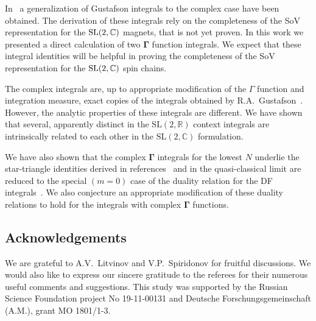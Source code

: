 \documentclass[pdftex]{sigma}
\numberwithin{equation}{section}
\begin{document}
In~\cite{Derkachov:2016ucn,Derkachov:2017pvx} a generalization of Gustafson integrals to the complex case
have been obtained. The derivation of these integrals rely on the completeness of the SoV representation for the
${\rm SL}(2,\mathbb C)$ magnets, that is not yet proven. In this work we presented a direct calculation of two
$\boldsymbol\Gamma$ function integrals. We expect that these integral identities will be helpful in proving the
completeness of the SoV representation for the ${\rm SL}(2,\mathbb C)$ spin chains.

The complex integrals are, up to appropriate modification of the $\Gamma$ function and integration measure, exact
copies of the integrals obtained by R.A.~Gustafson~\cite{Gustafson94}. However, the analytic properties of these
integrals are different. We have shown that several, apparently distinct in the $\mathrm{SL}(2,\mathbb R)$ context
integrals are intrinsically related to each other in the $\mathrm{SL}(2,\mathbb C)$ formulation.

 We have also shown that the complex $\boldsymbol\Gamma$ integrals for the lowest $N$ underlie the star-triangle
identities derived in references~\cite{Bazhanov:2007vg,Kels:2013ola,Kels:2015bda} and in the quasi-classical limit are
reduced to the special $(m=0)$ case of the duality relation for the DF
integrals~\cite{Baseilhac:1998eq,Dotsenko:1984ad,Fateev:2007qn}. We also conjecture an appropriate modification of
these duality relations to hold for the integrals with complex $\boldsymbol \Gamma$ functions.

\subsection*{Acknowledgements}

We are grateful to A.V.~Litvinov and V.P.~Spiridonov for fruitful discussions. {We would also like to express our sincere gratitude to the referees for their numerous useful comments and suggestions.} This study was supported by the Russian Science Foundation project No 19-11-00131 and Deutsche Forschungsgemeinschaft (A.M.), grant MO 1801/1-3.
\end{document}
